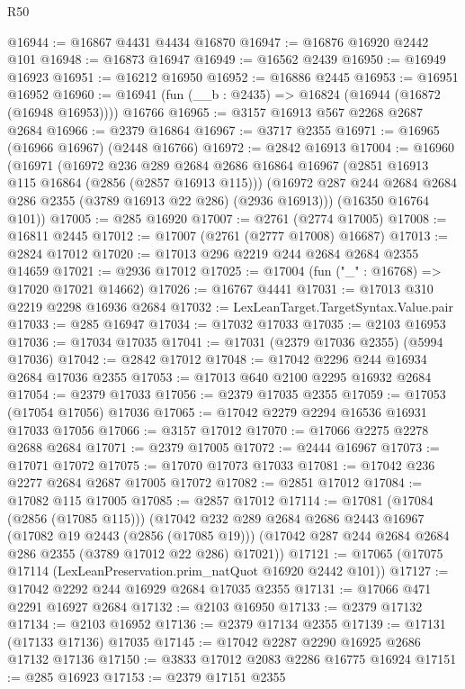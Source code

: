 \begin{lexlean}{R50}
\begin{coremodule}
@16944 := @16867 @4431 @4434 @16870
@16947 := @16876 @16920 @2442 @101
@16948 := @16873 @16947
@16949 := @16562 @2439
@16950 := @16949 @16923
@16951 := @16212 @16950
@16952 := @16886 @2445
@16953 := @16951 @16952
@16960 := @16941 (fun (__b : @2435) => @16824 (@16944 (@16872 (@16948 @16953)))) @16766
@16965 := @3157 @16913 @567 @2268 @2687 @2684
@16966 := @2379 @16864
@16967 := @3717 @2355
@16971 := @16965 (@16966 @16967) (@2448 @16766)
@16972 := @2842 @16913
@17004 := @16960
    (@16971
      (@16972
        @236
        @289
        @2684
        @2686
        @16864
        @16967
        (@2851 @16913 @115 @16864 (@2856 (@2857 @16913 @115)))
        (@16972 @287 @244 @2684 @2684 @286 @2355 (@3789 @16913 @22 @286) (@2936 @16913)))
      (@16350 @16764 @101))
@17005 := @285 @16920
@17007 := @2761 (@2774 @17005)
@17008 := @16811 @2445
@17012 := @17007 (@2761 (@2777 @17008) @16687)
@17013 := @2824 @17012
@17020 := @17013 @296 @2219 @244 @2684 @2684 @2355 @14659
@17021 := @2936 @17012
@17025 := @17004 (fun ("_" : @16768) => @17020 @17021 @14662)
@17026 := @16767 @4441
@17031 := @17013 @310 @2219 @2298 @16936 @2684
@17032 := LexLeanTarget.TargetSyntax.Value.pair
@17033 := @285 @16947
@17034 := @17032 @17033
@17035 := @2103 @16953
@17036 := @17034 @17035
@17041 := @17031 (@2379 @17036 @2355) (@5994 @17036)
@17042 := @2842 @17012
@17048 := @17042 @2296 @244 @16934 @2684 @17036 @2355
@17053 := @17013 @640 @2100 @2295 @16932 @2684
@17054 := @2379 @17033
@17056 := @2379 @17035 @2355
@17059 := @17053 (@17054 @17056) @17036
@17065 := @17042 @2279 @2294 @16536 @16931 @17033 @17056
@17066 := @3157 @17012
@17070 := @17066 @2275 @2278 @2688 @2684
@17071 := @2379 @17005
@17072 := @2444 @16967
@17073 := @17071 @17072
@17075 := @17070 @17073 @17033
@17081 := @17042 @236 @2277 @2684 @2687 @17005 @17072
@17082 := @2851 @17012
@17084 := @17082 @115 @17005
@17085 := @2857 @17012
@17114 := @17081
    (@17084 (@2856 (@17085 @115)))
    (@17042
      @232
      @289
      @2684
      @2686
      @2443
      @16967
      (@17082 @19 @2443 (@2856 (@17085 @19)))
      (@17042 @287 @244 @2684 @2684 @286 @2355 (@3789 @17012 @22 @286) @17021))
@17121 := @17065 (@17075 @17114 (LexLeanPreservation.prim_natQuot @16920 @2442 @101))
@17127 := @17042 @2292 @244 @16929 @2684 @17035 @2355
@17131 := @17066 @471 @2291 @16927 @2684
@17132 := @2103 @16950
@17133 := @2379 @17132
@17134 := @2103 @16952
@17136 := @2379 @17134 @2355
@17139 := @17131 (@17133 @17136) @17035
@17145 := @17042 @2287 @2290 @16925 @2686 @17132 @17136
@17150 := @3833 @17012 @2083 @2286 @16775 @16924
@17151 := @285 @16923
@17153 := @2379 @17151 @2355

\end{coremodule}
\end{lexlean}
